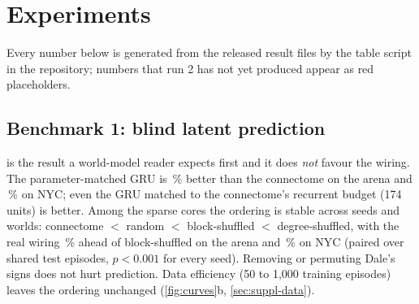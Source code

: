 \section{Experiments}
\label{sec:exp}
Every number below is generated from the released result files by the table script in the repository; numbers that run 2 has not yet produced appear as red placeholders.

\subsection{Benchmark 1: blind latent prediction}
\label{sec:pred}
\begin{table}[t]
  \centering\small
  \caption{\textbf{Blind latent prediction} (mean over horizons 1 to 8 in the 8:16 window; MSE in whitened PCA-256
  space, mean\pm sd over seeds). Lower MSE and higher cosine are better. Every student beats both trivial predictors.
  The GRU wins; the connectome beats every sparse control and the dense net on NYC but not the dense net on the arena.}
  \label{tab:pred}
  \resizebox{\linewidth}{!}{}
\end{table}
 is the result a world-model reader expects first and it does \emph{not} favour the wiring. The
parameter-matched GRU is \nGruBetterArena\,\% better than the connectome on the arena and \nGruBetterNyc\,\% on NYC;
even the GRU matched to the connectome's recurrent budget (174 units) is better. Among the sparse cores the ordering is
stable across seeds and worlds: connectome $<$ random $<$ block-shuffled $<$ degree-shuffled, with the real wiring
\nConnOverBlockArena\,\% ahead of block-shuffled on the arena and \nConnOverBlockNyc\,\% on NYC (paired over shared
test episodes, $p<0.001$ for every seed). Removing or permuting Dale's signs does not hurt prediction. Data efficiency
(50 to 1,000 training episodes) leaves the ordering unchanged (\cref{fig:curves}b, \cref{sec:suppl-data}).

